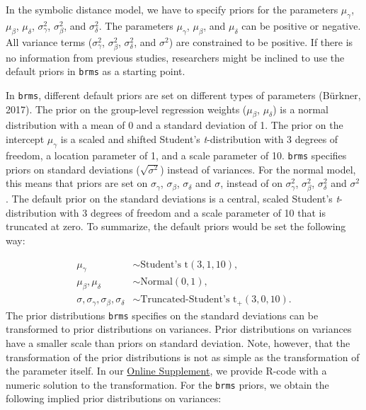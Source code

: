 \documentclass[
  english,
  doc,floatsintext]{apa6}
\begin{document}
In the symbolic distance model, we have to specify priors for the parameters \(\mu_{\gamma}\), \(\mu_{\beta}\), \(\mu_{\delta}\), \(\sigma^2_{\gamma}\), \(\sigma^2_{\beta}\), and \(\sigma^2_{\delta}\). The parameters \(\mu_{\gamma}\), \(\mu_{\beta}\), and \(\mu_{\delta}\) can be positive or negative. All variance terms (\(\sigma_{\gamma}^2\), \(\sigma_{\beta}^2\), \(\sigma_{\delta}^2\), and \(\sigma^2\)) are constrained to be positive. If there is no information from previous studies, researchers might be inclined to use the default priors in \texttt{brms} as a starting point.

In \texttt{brms}, different default priors are set on different types of parameters (Bürkner, 2017). The prior on the group-level regression weights (\(\mu_{\beta}\), \(\mu_{\delta}\)) is a normal distribution with a mean of 0 and a standard deviation of 1. The prior on the intercept \(\mu_{\gamma}\) is a scaled and shifted Student's \emph{t}-distribution with 3 degrees of freedom, a location parameter of 1, and a scale parameter of 10. \texttt{brms} specifies priors on standard deviations (\(\sqrt{\sigma^2}\)) instead of variances. For the normal model, this means that priors are set on \(\sigma_{\gamma}\), \(\sigma_{\beta}\), \(\sigma_{\delta}\) and \(\sigma\), instead of on \(\sigma_{\gamma}^2\), \(\sigma_{\beta}^2\), \(\sigma_{\delta}^2\) and \(\sigma^2\). The default prior on the standard deviations is a central, scaled Student's \emph{t}-distribution with 3 degrees of freedom and a scale parameter of 10 that is truncated at zero. To summarize, the default priors would be set the following way:

\begin{equation}
\begin{aligned}
\mu_{\gamma} &\sim \text{Student's t}(3, 1, 10), \label{eq:chosenpriors1} \\ 
\mu_{\beta}, \mu_{\delta} &\sim \text{Normal}(0, 1), \\ 
\sigma, \sigma_{\gamma}, \sigma_{\beta}, \sigma_{\delta} &\sim \text{Truncated-Student's t}_{+}(3, 0, 10). 
\end{aligned}
\end{equation}
The prior distributions \texttt{brms} specifies on the standard deviations can be transformed to prior distributions on variances. Prior distributions on variances have a smaller scale than priors on standard deviation. Note, however, that the transformation of the prior distributions is not as simple as the transformation of the parameter itself. In our \href{https://github.com/MyrtheV/Bayesian-Hierarchical-Modelling-An-Introduction-and-Reassessment/tree/main/R\%20code/Prior\%20transformation}{Online Supplement}, we provide R-code with a numeric solution to the transformation. For the \texttt{brms} priors, we obtain the following implied prior distributions on variances:
\end{document}
